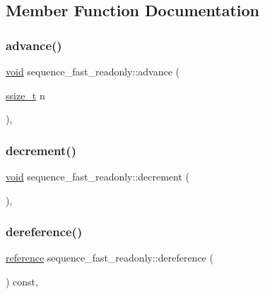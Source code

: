 \subsection{Member Function Documentation}
\mbox{\label{classsequence__fast__readonly_a7ffa2a811265609444262806136b7204}} 
\subsubsection{\texorpdfstring{advance()}{advance()}}
{\footnotesize\ttfamily \mbox{\hyperlink{_s_d_l__opengles2__gl2ext_8h_ae5d8fa23ad07c48bb609509eae494c95}{void}} sequence\+\_\+fast\+\_\+readonly\+::advance (\begin{DoxyParamCaption}\item[{\mbox{\hyperlink{detail_2common_8h_ac430d16fc097b3bf0a7469cfd09decda}{ssize\+\_\+t}}}]{n }\end{DoxyParamCaption})\hspace{0.3cm}{\ttfamily [inline]}, {\ttfamily [protected]}}

\mbox{\label{classsequence__fast__readonly_a7f31daab2a88f9120f06c0bc140ad4af}} 
\subsubsection{\texorpdfstring{decrement()}{decrement()}}
{\footnotesize\ttfamily \mbox{\hyperlink{_s_d_l__opengles2__gl2ext_8h_ae5d8fa23ad07c48bb609509eae494c95}{void}} sequence\+\_\+fast\+\_\+readonly\+::decrement (\begin{DoxyParamCaption}{ }\end{DoxyParamCaption})\hspace{0.3cm}{\ttfamily [inline]}, {\ttfamily [protected]}}

\mbox{\label{classsequence__fast__readonly_a66ee58d3a059273dffe9dc0cf76a9550}} 
\subsubsection{\texorpdfstring{dereference()}{dereference()}}
{\footnotesize\ttfamily \mbox{\hyperlink{classsequence__fast__readonly_a7b285c12cc5332e8fc7998bcab092fa7}{reference}} sequence\+\_\+fast\+\_\+readonly\+::dereference (\begin{DoxyParamCaption}{ }\end{DoxyParamCaption}) const\hspace{0.3cm}{\ttfamily [inline]}, {\ttfamily [protected]}}

